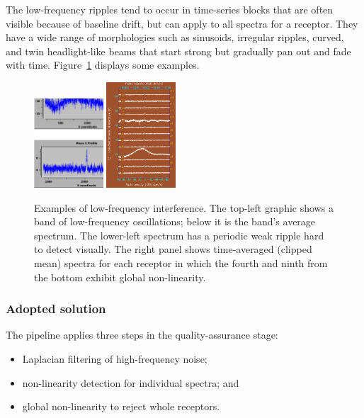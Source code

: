 \documentclass[final,authoryear,5p,times,twocolumn]{elsarticle}
\begin{document}
The low-frequency ripples tend to occur in time-series blocks that are
often visible because of baseline drift, but can apply to all spectra
for a receptor.  They have a wide range of morphologies such as
sinusoids, irregular ripples, curved, and twin headlight-like beams
that start strong but gradually pan out and fade with time.
Figure~\ref{fig:badbase:interference} displays some examples.

\begin{figure}[!ht]
\includegraphics[width=0.23\textwidth]{P61_f2a}
\includegraphics[width=0.23\textwidth]{P61_f2b}
\caption{Examples of low-frequency interference.  The top-left graphic
 shows a band of low-frequency oscillations; below it is the band's
 average spectrum.  The lower-left spectrum has a periodic weak
 ripple hard to detect visually.  The right panel shows time-averaged
 (clipped mean) spectra for each receptor in which the fourth and
  ninth from the bottom exhibit global non-linearity.}
\label{fig:badbase:interference}
\end{figure}

\subsubsection{Adopted solution}

The pipeline applies three steps in the quality-assurance stage:
\begin{itemize}
\item Laplacian filtering of high-frequency noise;
\item non-linearity detection for individual spectra; and
\item global non-linearity to reject whole receptors.
\end{itemize}
\end{document}
